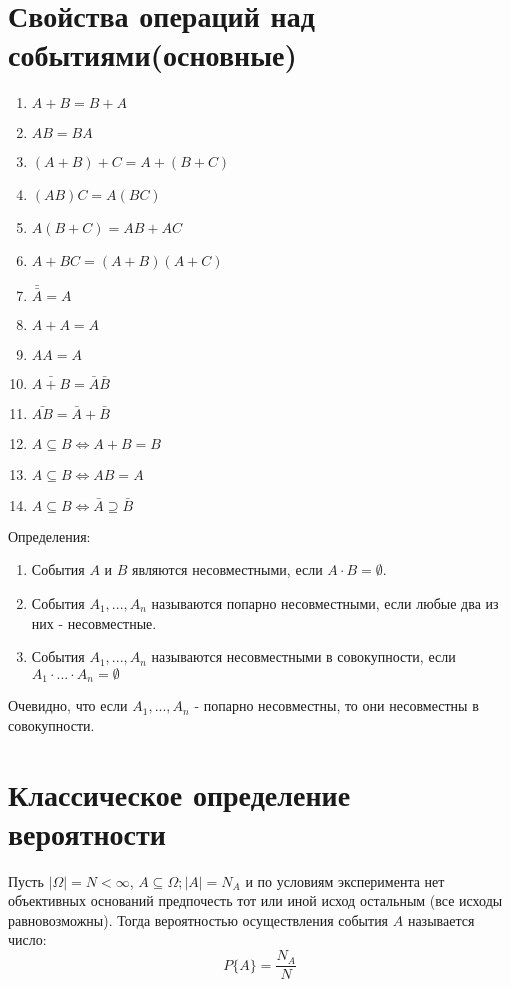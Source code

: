 \documentclass[a4paper, 12pt]{report}
\begin{document}
	\section{Свойства операций над событиями(основные)}
		\begin{enumerate}
			\item $A+B=B+A$
			\item $AB=BA$
			\item $(A+B)+C=A+(B+C)$
			\item $(AB)C=A(BC)$
			\item $A(B+C)=AB+AC$
			\item $A+BC=(A+B)(A+C)$
			\item $\bar{\bar{A}}=A$
			\item $A+A=A$
			\item $AA=A$
			\item $\bar{A+B}=\bar{A}\bar{B}$
			\item $\bar{AB}=\bar{A}+\bar{B}$
			\item $A\subseteq B\Leftrightarrow A+B=B$
			\item $A\subseteq B\Leftrightarrow AB=A$
			\item $A\subseteq B\Leftrightarrow \bar{A}\supseteq\bar{B}$
		\end{enumerate}
		
		Определения:
		\begin{enumerate}
			\item События $A$ и $B$ являются несовместными, если $A\cdot B=\emptyset$.
			\item События $A_1,...,A_n$ называются попарно несовместными, если любые два из них - несовместные.
			\item События $A_1,...,A_n$ называются несовместными в совокупности, если $A_1\cdot...\cdot A_n=\emptyset$
		\end{enumerate}
		
		Очевидно, что если $A_1,...,A_n$ - попарно несовместны, то они несовместны в совокупности.
		
	\section{Классическое определение вероятности}
		Пусть $|\Omega|=N<\infty$, $A\subseteq\Omega; |A|=N_A$ и по условиям эксперимента нет объективных оснований предпочесть тот или иной исход остальным (все исходы равновозможны). Тогда вероятностью осуществления события $A$ называется число:
		\begin{equation}
			P\{A\}=\frac{N_A}{N}
		\end{equation}
	
\end{document}
